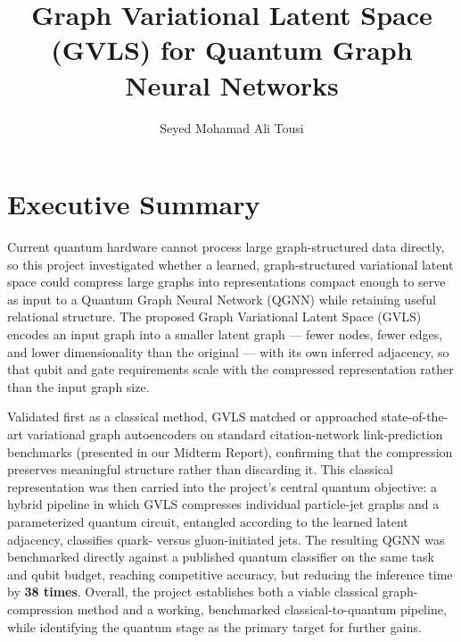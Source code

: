 \documentclass[11pt]{article}
\title{Graph Variational Latent Space (GVLS) for Quantum Graph Neural Networks}
\author{Seyed Mohamad Ali Tousi}
\date{}
\begin{document}
\maketitle

\section*{Executive Summary}

Current quantum hardware cannot process large graph-structured data directly, so this
  project investigated whether a learned, graph-structured variational latent space could
  compress large graphs into representations compact enough to serve as input to a Quantum
  Graph Neural Network (QGNN) while retaining useful relational structure. The proposed
  Graph Variational Latent Space (GVLS) encodes an input graph into a smaller latent graph --- fewer nodes, fewer
  edges, and lower dimensionality than the original --- with its own inferred adjacency, so
  that qubit and gate requirements scale with the compressed representation rather than
  the input graph size.

  Validated first as a classical method, GVLS matched or approached state-of-the-art
  variational graph autoencoders on standard citation-network link-prediction benchmarks (presented in our Midterm Report),
  confirming that the compression preserves meaningful structure rather than discarding it.
  This classical representation was then carried into the project's central quantum
  objective: a hybrid pipeline in which GVLS compresses individual particle-jet graphs and
  a parameterized quantum circuit, entangled according to the learned latent adjacency,
  classifies quark- versus gluon-initiated jets. The resulting QGNN was benchmarked
  directly against a published quantum classifier on the same task and qubit budget,
  reaching competitive accuracy, but reducing the inference time by \textbf{38 times}. Overall, the project establishes both a viable classical graph-compression
  method and a working, benchmarked classical-to-quantum pipeline, while identifying the
  quantum stage as the primary target for further gains.
\end{document}
